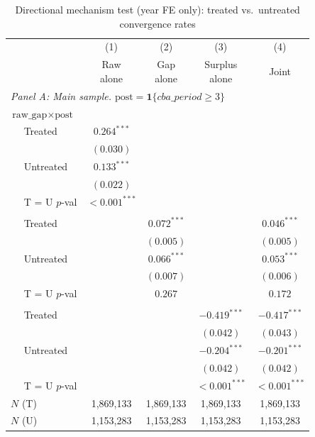 \begin{table}[H]
\centering
\caption{Directional mechanism test (year FE only): treated vs.\ untreated convergence rates}
\label{tab:mechanism_test_directional_yearonly}
\scriptsize
\begin{tabular}{lcccc}
\toprule\toprule
 & (1) & (2) & (3) & (4) \\
 & \shortstack{Raw \\ alone} & \shortstack{Gap \\ alone} & \shortstack{Surplus \\ alone} & Joint \\
\midrule
\multicolumn{5}{l}{\textit{Panel A: Main sample. $\text{post} = \mathbf{1}\{cba\_period \geq 3\}$}} \\
\midrule
\multicolumn{5}{l}{$\text{raw\_gap} \times \text{post}$} \\
$\quad$ Treated & $0.264^{***}$ &  &  &  \\
 & $(0.030)$ &  &  &  \\
$\quad$ Untreated & $0.133^{***}$ &  &  &  \\
 & $(0.022)$ &  &  &  \\
$\quad$ T = U $p$-val & $<\!0.001^{***}$ &  &  &  \\
\addlinespace[2pt]
\multicolumn{5}{l}{$\text{gap} \times \text{post}$} \\
$\quad$ Treated &  & $0.072^{***}$ &  & $0.046^{***}$ \\
 &  & $(0.005)$ &  & $(0.005)$ \\
$\quad$ Untreated &  & $0.066^{***}$ &  & $0.053^{***}$ \\
 &  & $(0.007)$ &  & $(0.006)$ \\
$\quad$ T = U $p$-val &  & $0.267$ &  & $0.172$ \\
\addlinespace[2pt]
\multicolumn{5}{l}{$\text{surplus} \times \text{post}$} \\
$\quad$ Treated &  &  & $-0.419^{***}$ & $-0.417^{***}$ \\
 &  &  & $(0.042)$ & $(0.043)$ \\
$\quad$ Untreated &  &  & $-0.204^{***}$ & $-0.201^{***}$ \\
 &  &  & $(0.042)$ & $(0.042)$ \\
$\quad$ T = U $p$-val &  &  & $<\!0.001^{***}$ & $<\!0.001^{***}$ \\
\addlinespace[2pt]
$N$ (T) & 1,869,133 & 1,869,133 & 1,869,133 & 1,869,133 \\
$N$ (U) & 1,153,283 & 1,153,283 & 1,153,283 & 1,153,283 \\

\end{tabular}
\end{table}

